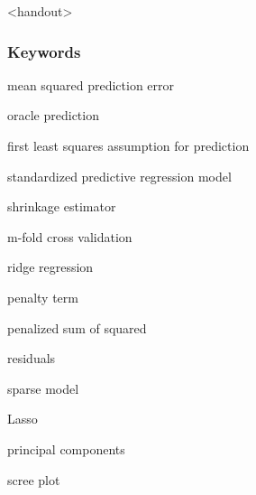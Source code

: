 

\begin{frame}<handout>
\frametitle{Keywords}
\begin{iteminline}
\item mean squared prediction error
\item oracle prediction
\item first least squares assumption for prediction
\item standardized predictive regression model
\item shrinkage estimator
\item m-fold cross validation
\item ridge regression
\item penalty term
\item penalized sum of squared
\item residuals
\item sparse model
\item Lasso
\item principal components
\item scree plot 
\end{iteminline}
\end{frame}


